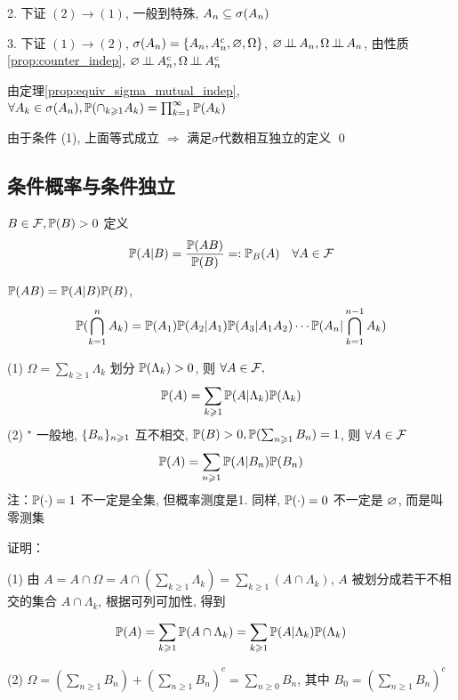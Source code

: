 2. 下证 $(2)\rightarrow (1)$, 一般到特殊, $A_n\subseteq \sigma(A_n)$

3. 下证 $(1)\rightarrow (2)$, $\sigma(A_n)=\{A_n,A_n^c, \varnothing, \Omega\}$, $\varnothing\operatorname{\perp\!\!\!\perp} A_n, \Omega\operatorname{\perp\!\!\!\perp} A_n$, 由性质\ref{prop:counter_indep}, $\varnothing\operatorname{\perp\!\!\!\perp} A_n^c, \Omega\operatorname{\perp\!\!\!\perp} A_n^c$

由定理\ref{prop:equiv_sigma_mutual_indep}, $\forall A_k\in \sigma(A_n), \mathbb{P}(\cap_{k\geqslant 1}A_k)=\prod_{k=1}^{\infty}\mathbb{P}(A_k)$

由于条件 (1), 上面等式成立 $\Rightarrow$ 满足$\sigma$代数相互独立的定义 \qed

\subsection{条件概率与条件独立}

\begin{definition}[条件概率]\label{def:con_prob}
    $B\in \mathcal{F}, \mathbb{P}(B)>0$ 定义
    \[
    \mathbb{P}(A|B)=\frac{\mathbb{P}(AB)}{\mathbb{P}(B)}=: \mathbb{P}_B(A)\quad \forall A\in \mathcal{F}
    \]
\end{definition}

\begin{theorem}[乘法公式]\label{thm:multiply_func}
    $\mathbb{P}(AB)=\mathbb{P}(A|B)\mathbb{P}(B)$,
    \begin{equation}
    \mathbb{P}(\bigcap_{k=1}^{n}A_k)=\mathbb{P}(A_1)\mathbb{P}(A_2|A_1)\mathbb{P}(A_3|A_1A_2)\cdots \mathbb{P}(A_n|\bigcap_{k=1}^{n-1}A_k)
		\label{eq:multiply_func}
		\end{equation}
\end{theorem}

\begin{theorem}[全概公式]\label{thm:law_total_prob}
    (1) $\Omega=\sum_{k\geq 1}\Lambda_k$ 划分 $\mathbb{P}(\Lambda_k)>0$, 则 $\forall A\in \mathcal{F},$
    \[
    \mathbb{P}(A)=\sum_{k\geqslant 1}\mathbb{P}(A|\Lambda_k)\mathbb{P}(\Lambda_k)
    \]
    (2) $^\star$ 一般地, $\{{B}_{n}\}_{n \geqslant 1}$ 互不相交, $\mathbb{P}(B)>0, \mathbb{P}(\sum_{n\geqslant 1}B_n)=1$, 则 $\forall A\in \mathcal{F}$
    \[
    \mathbb{P}(A)=\sum_{n\geqslant 1}\mathbb{P}(A|B_n)\mathbb{P}(B_n)
    \]
    注：$\mathbb{P}(\cdot)=1$ 不一定是全集, 但概率测度是1. 同样, $\mathbb{P}(\cdot)=0$ 不一定是 $\varnothing$, 而是叫零测集
\end{theorem}

证明：

(1) 由 $A=A\cap\Omega=A\cap (\sum_{k\geq 1}\Lambda_k)=\sum_{k\geq 1}(A\cap \Lambda_k)$, $A$ 被划分成若干不相交的集合 $A\cap \Lambda_k$, 根据可列可加性, 得到 

\[
\mathbb{P}(A)=\sum_{k\geqslant 1}\mathbb{P}(A\cap \Lambda_k)=\sum_{k\geqslant 1}\mathbb{P}(A|\Lambda_k)\mathbb{P}(\Lambda_k)
\]

(2) $\Omega=(\sum_{n\geq 1}B_n)+(\sum_{n\geq 1}B_n)^c=\sum_{n\geq 0}B_n$, 其中 $B_0=(\sum_{n\geq 1}B_n)^c$

